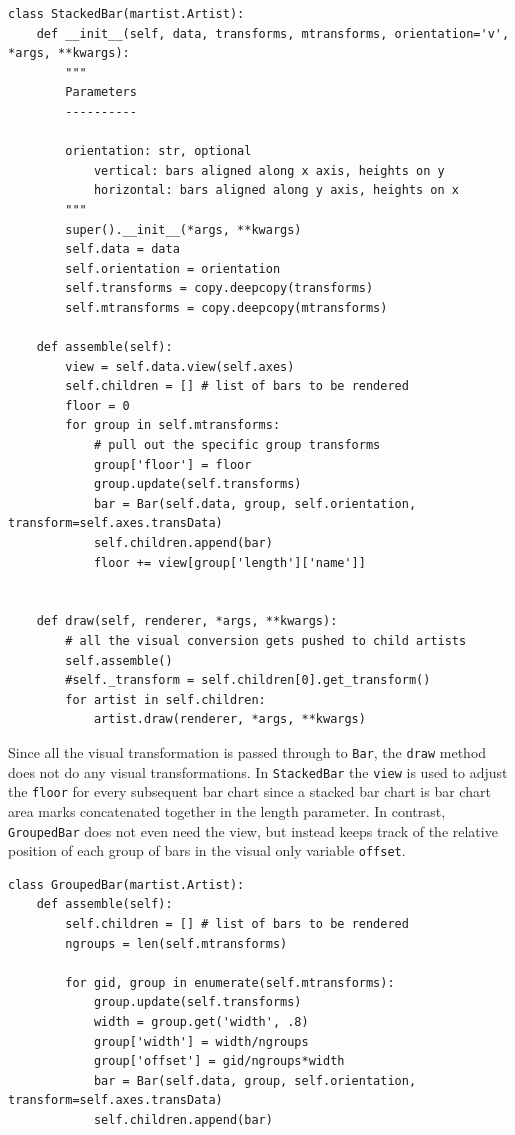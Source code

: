 \documentclass[../main.tex]{subfiles}
\begin{document}
\begin{verbatim}
class StackedBar(martist.Artist):
    def __init__(self, data, transforms, mtransforms, orientation='v', *args, **kwargs):
        """
        Parameters
        ----------
   
        orientation: str, optional
            vertical: bars aligned along x axis, heights on y
            horizontal: bars aligned along y axis, heights on x   
        """
        super().__init__(*args, **kwargs)
        self.data = data
        self.orientation = orientation
        self.transforms = copy.deepcopy(transforms)
        self.mtransforms = copy.deepcopy(mtransforms)

    def assemble(self):
        view = self.data.view(self.axes)
        self.children = [] # list of bars to be rendered
        floor = 0
        for group in self.mtransforms:
            # pull out the specific group transforms
            group['floor'] = floor
            group.update(self.transforms)
            bar = Bar(self.data, group, self.orientation, transform=self.axes.transData)
            self.children.append(bar)
            floor += view[group['length']['name']]
            
            
    def draw(self, renderer, *args, **kwargs):
        # all the visual conversion gets pushed to child artists
        self.assemble()
        #self._transform = self.children[0].get_transform()
        for artist in self.children:
            artist.draw(renderer, *args, **kwargs)

\end{verbatim}

Since all the visual transformation is passed through to \texttt{Bar}, the \texttt{draw} method does not do any visual transformations. In \texttt{StackedBar} the \texttt{view} is used to adjust the \texttt{floor} for every subsequent bar chart since a stacked bar chart is bar chart area marks concatenated together in the length parameter. In contrast, \texttt{GroupedBar} does not even need the view, but instead keeps track of the relative position of each group of bars in the visual only variable \texttt{offset}. 

\begin{verbatim}
class GroupedBar(martist.Artist):
    def assemble(self):
        self.children = [] # list of bars to be rendered
        ngroups = len(self.mtransforms)
        
        for gid, group in enumerate(self.mtransforms):
            group.update(self.transforms)
            width = group.get('width', .8)
            group['width'] = width/ngroups
            group['offset'] = gid/ngroups*width 
            bar = Bar(self.data, group, self.orientation, transform=self.axes.transData)     
            self.children.append(bar)
\end{verbatim}
\end{document}
